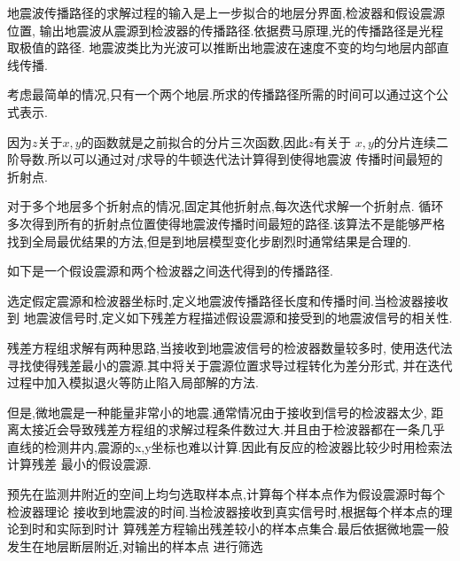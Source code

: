 \documentclass[UTF8]{ctexbeamer}	%
\theoremstyle{plain}
\theoremstyle{definition}
\theoremstyle{remark}
\numberwithin{equation}{section}
\begin{document}
\begin{frame}
    地震波传播路径的求解过程的输入是上一步拟合的地层分界面,检波器和假设震源位置,
    输出地震波从震源到检波器的传播路径.依据费马原理,光的传播路径是光程取极值的路径.
    地震波类比为光波可以推断出地震波在速度不变的均匀地层内部直线传播.

    考虑最简单的情况,只有一个两个地层.所求的传播路径所需的时间可以通过这个公式表示.
\end{frame}

\begin{frame}
    因为$z$关于$x,y$的函数就是之前拟合的分片三次函数,因此$z$有关于
          $x,y$的分片连续二阶导数.所以可以通过对$f$求导的牛顿迭代法计算得到使得地震波
          传播时间最短的折射点.

          对于多个地层多个折射点的情况,固定其他折射点,每次迭代求解一个折射点.
          循环多次得到所有的折射点位置使得地震波传播时间最短的路径.该算法不是能够严格
          找到全局最优结果的方法,但是到地层模型变化步剧烈时通常结果是合理的.

          如下是一个假设震源和两个检波器之间迭代得到的传播路径.
\end{frame}

\begin{frame}
    选定假定震源和检波器坐标时,定义地震波传播路径长度和传播时间.当检波器接收到
    地震波信号时,定义如下残差方程描述假设震源和接受到的地震波信号的相关性.

\end{frame}

\begin{frame}
    残差方程组求解有两种思路,当接收到地震波信号的检波器数量较多时,
    使用迭代法寻找使得残差最小的震源.其中将关于震源位置求导过程转化为差分形式,
    并在迭代过程中加入模拟退火等防止陷入局部解的方法.

               但是,微地震是一种能量非常小的地震.通常情况由于接收到信号的检波器太少,
            距离太接近会导致残差方程组的求解过程条件数过大.并且由于检波器都在一条几乎
            直线的检测井内,震源的x,y坐标也难以计算.因此有反应的检波器比较少时用检索法计算残差
            最小的假设震源.

            预先在监测井附近的空间上均匀选取样本点,计算每个样本点作为假设震源时每个检波器理论
接收到地震波的时间.当检波器接收到真实信号时,根据每个样本点的理论到时和实际到时计
算残差方程输出残差较小的样本点集合.最后依据微地震一般发生在地层断层附近,对输出的样本点
进行筛选
            
\end{frame}
\end{document}
